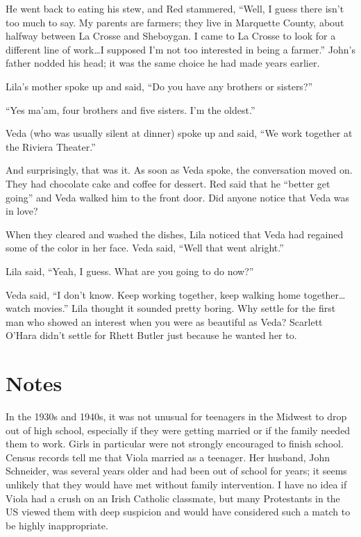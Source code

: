 \documentclass[
  american,
  letterpaper,
]{book}
\begin{document}
He went back to eating his stew, and Red stammered, ``Well, I guess
there isn't too much to say. My parents are farmers; they live in
Marquette County, about halfway between La Crosse and Sheboygan. I came
to La Crosse to look for a different line of work\ldots I supposed I'm
not too interested in being a farmer.'' John's father nodded his head;
it was the same choice he had made years earlier.

Lila's mother spoke up and said, ``Do you have any brothers or
sisters?''

``Yes ma'am, four brothers and five sisters. I'm the oldest.''

Veda (who was usually silent at dinner) spoke up and said, ``We work
together at the Riviera Theater.''

And surprisingly, that was it. As soon as Veda spoke, the conversation
moved on. They had chocolate cake and coffee for dessert. Red said that
he ``better get going'' and Veda walked him to the front door. Did
anyone notice that Veda was in love?

When they cleared and washed the dishes, Lila noticed that Veda had
regained some of the color in her face. Veda said, ``Well that went
alright.''

Lila said, ``Yeah, I guess. What are you going to do now?''

Veda said, ``I don't know. Keep working together, keep walking home
together\ldots watch movies.'' Lila thought it sounded pretty boring.
Why settle for the first man who showed an interest when you were as
beautiful as Veda? Scarlett O'Hara didn't settle for Rhett Butler just
because he wanted her to.

\section{Notes}\label{notes-20}

In the 1930s and 1940s, it was not unusual for teenagers in the Midwest
to drop out of high school, especially if they were getting married or
if the family needed them to work. Girls in particular were not strongly
encouraged to finish school. Census records tell me that Viola married
as a teenager. Her husband, John Schneider, was several years older and
had been out of school for years; it seems unlikely that they would have
met without family intervention. I have no idea if Viola had a crush on
an Irish Catholic classmate, but many Protestants in the US viewed them
with deep suspicion and would have considered such a match to be highly
inappropriate.
\end{document}
